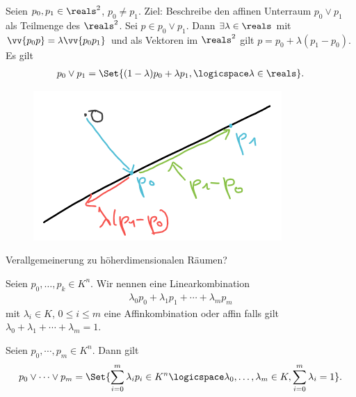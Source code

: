 \begin{beispiel*}
    Seien \( p_0,p_1\in \reals^2 \), \( p_0\neq p_1 \). Ziel: Beschreibe den affinen Unterraum \( p_0\vee p_1 \) als Teilmenge des \( \reals^2 \). Sei \( p\in p_0\vee p_1 \). Dann \( \exists \lambda\in \reals \) mit \( \vv{p_0 p}=\lambda \vv{p_0 p_1} \) und als Vektoren im \( \reals^2 \) gilt \( p=p_0+\lambda(p_1-p_0) \). Es gilt
    \begin{align*}
        p_0 \vee p_1=\Set{(1-\lambda)p_0+\lambda p_1,\logicspace \lambda\in \reals}.
    \end{align*}
    \begin{figure}[H]
        \centering
        \includegraphics[width=0.5\linewidth]{figures/affine_verbindungsgerade}
        \label{fig:affine_verbindungsgerade}
    \end{figure}
    
\end{beispiel*}
\begin{frage*}
    Verallgemeinerung zu höherdimensionalen Räumen?
\end{frage*}
\begin{definition*}
    Seien \( p_0,\dotsc,p_k\in  K^n \). Wir nennen eine Linearkombination
    \begin{align*}
        \lambda_0 p_0+\lambda_1 p_1+\dotsb+\lambda_m p_m
    \end{align*}
    mit \( \lambda_i\in K \), \( 0\leq i\leq m \) eine Affinkombination oder affin falls gilt \( \lambda_0+\lambda_1+\dotsb+\lambda_m=1 \).
\end{definition*}
\begin{satz}
    Seien \( p_0,\dotsb,p_m\in K^n \). Dann gilt
    \begin{align*}
        p_0\vee \dotsb \vee p_m =\Set{\sum_{i=0}^{m}\lambda_i p_i\in K^n \logicspace \lambda_0,\dotsc,\lambda_m\in K, \sum_{i=0}^{m}\lambda_i=1}.
    \end{align*}
\end{satz}
